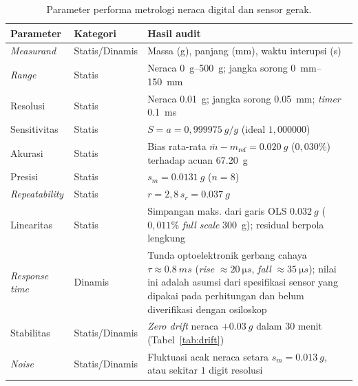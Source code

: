 \documentclass[a4paper, 12pt]{article}
\begin{document}
\begin{table}[H]
\centering
\singlespacing
\caption{Parameter performa metrologi neraca digital dan sensor gerak.}
\label{tab:param}
\small
\begin{tabularx}{\textwidth}{@{}l l X@{}}
\toprule
\textbf{Parameter} & \textbf{Kategori} & \textbf{Hasil audit}\\
\midrule
\textit{Measurand} & Statis/Dinamis & Massa (g), panjang (mm), waktu interupsi (s)\\
\textit{Range} & Statis & Neraca \SIrange{0}{500}{g}; jangka sorong \SIrange{0}{150}{mm}\\
Resolusi & Statis & Neraca \SI{0,01}{g}; jangka sorong \SI{0,05}{mm}; \textit{timer} \SI{0,1}{ms}\\
Sensitivitas & Statis & $S=a=0{,}999975\ \si{g/g}$ (ideal $1{,}000000$)\\
Akurasi & Statis & Bias rata-rata $\bar{m}-m_{\mathrm{ref}}=\SI{0,020}{g}$ ($0{,}030\%$) terhadap acuan \SI{67,20}{g}\\
Presisi & Statis & $s_m=\SI{0,0131}{g}$ ($n=8$)\\
\textit{Repeatability} & Statis & $r=2{,}8\,s_r=\SI{0,037}{g}$\\
Linearitas & Statis & Simpangan maks. dari garis OLS $\SI{0,032}{g}$ ($0{,}011\%$ \textit{full scale} \SI{300}{g}); residual berpola lengkung\\
\textit{Response time} & Dinamis & Tunda optoelektronik gerbang cahaya $\tau\approx\SI{0,8}{ms}$ (\textit{rise} $\approx\SI{20}{\micro s}$, \textit{fall} $\approx\SI{35}{\micro s}$); nilai ini adalah asumsi dari spesifikasi sensor yang dipakai pada perhitungan dan belum diverifikasi dengan osiloskop\\
Stabilitas & Statis/Dinamis & \textit{Zero drift} neraca $+\SI{0,03}{g}$ dalam $30$ menit (Tabel~\ref{tab:drift})\\
\textit{Noise} & Statis/Dinamis & Fluktuasi acak neraca setara $s_m=\SI{0,013}{g}$, atau sekitar $1$ digit resolusi\\
\bottomrule
\end{tabularx}
\end{table}
\end{document}
